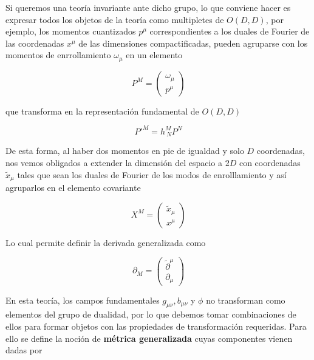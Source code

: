 \documentclass{article}
\numberwithin{equation}{section}
\begin{document}
Si queremos una teoría invariante ante dicho grupo, lo que conviene hacer es expresar todos los objetos de la teoría como multipletes de $ O(D,D) $, por ejemplo, los momentos cuantizados $ p^{\mu} $ correspondientes a los duales de Fourier de las coordenadas $ x^{\mu} $ de las dimensiones compactificadas, pueden agruparse con los momentos de enrrollamiento $ \omega_{\mu} $ en un elemento

\begin{equation}\label{key}
P^M= \begin{pmatrix}
\omega_{\mu} \\
p^{\mu}
\end{pmatrix}
\end{equation}

que transforma en la representación fundamental de $ O(D,D) $

\begin{equation}\label{key}
P'^M=h_{\ N}^M P^N
\end{equation}

De esta forma, al haber dos momentos en pie de igualdad y solo $ D $ coordenadas, nos vemos obligados a extender la dimensión del espacio a $ 2D $ con coordenadas $ \widetilde{x}_{\mu} $ tales que sean los duales de Fourier de los modos de enrolllamiento y así agruparlos en el elemento covariante

\begin{equation}\label{key}
X^M= \begin{pmatrix}
\widetilde{x}_{\mu}\\
x^{\mu}
\end{pmatrix}
\end{equation}

Lo cual permite definir la derivada generalizada como

\begin{equation}\label{key}
\partial_M= 
\begin{pmatrix}
\widetilde{\partial}^{\mu} \\
\partial_ {\mu}
\end{pmatrix}
\end{equation}

En esta teoría, los campos fundamentales $ g_{\mu\nu},b_{\mu\nu} $ y $ \phi $ no transforman como elementos del grupo de dualidad, por lo que debemos tomar combinaciones de ellos para formar objetos con las propiedades de transformación requeridas. Para ello se define la noción de \textbf{métrica generalizada} cuyas componentes vienen dadas por
\end{document}
